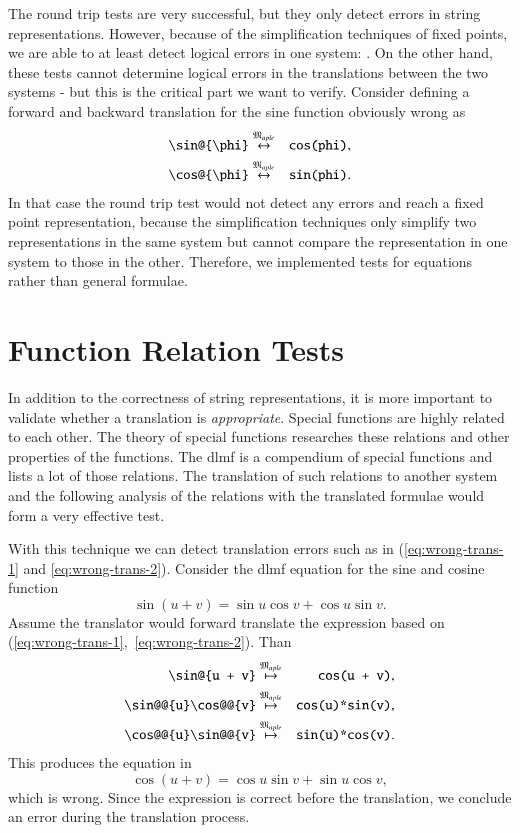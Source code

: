 The round trip tests are very successful, but they only detect errors in string representations. However, because of the simplification techniques of fixed points, we are able to at least detect logical errors in one system: \Maple. On the other hand, these tests cannot determine logical errors in the translations between the two systems - but this is the critical part we want to verify. Consider defining a forward and backward translation for the sine function obviously wrong as
\begin{eqnarray}
\verb|\sin@{\phi}| & \overset{\langMaple}{\leftrightarrow} & \verb|cos(phi)|,\label{eq:wrong-trans-1}\\
\verb|\cos@{\phi}| & \overset{\langMaple}{\leftrightarrow} & \verb|sin(phi)|.\label{eq:wrong-trans-2}
\end{eqnarray}
In that case the round trip test would not detect any errors and reach a fixed point representation, because the simplification techniques only simplify two representations in the same system but cannot compare the representation in one system to those in the other. Therefore, we implemented tests for equations rather than general formulae.

\section{Function Relation Tests}\label{sec:relation-tests}
In addition to the correctness of string representations, it is more important to validate whether a translation is \textit{appropriate}. Special functions are highly related to each other. The theory of special functions researches these relations and other properties of the functions. The \gls{dlmf} is a compendium of special functions and lists a lot of those relations. The translation of such relations to another system and the following analysis of the relations with the translated formulae would form a very effective test.

With this technique we can detect translation errors such as in (\ref{eq:wrong-trans-1} and \ref{eq:wrong-trans-2}). Consider the \gls{dlmf} equation for the sine and cosine function~\parencite[(4.21.2)]{NIST:DLMF}
\begin{equation}
\sin \left(u+v\right) = \sin{u}\cos{v} + \cos{u}\sin{v}.
\end{equation}
Assume the translator would forward translate the expression based on (\ref{eq:wrong-trans-1},~\ref{eq:wrong-trans-2}). Than
\begin{eqnarray}
\verb|\sin@{u + v}| & \overset{\langMaple}{\mapsto} & \verb|cos(u + v)|,\\
\verb|\sin@@{u}\cos@@{v}| & \overset{\langMaple}{\mapsto} & \verb|cos(u)*sin(v)|,\\
\verb|\cos@@{u}\sin@@{v}| & \overset{\langMaple}{\mapsto} & \verb|sin(u)*cos(v)|.
\end{eqnarray}
This produces the equation in \Maple
\begin{equation}
\cos\left(u+v\right) = \cos{u}\sin{v} + \sin{u}\cos{v},
\end{equation}
which is wrong. Since the expression is correct before the translation, we conclude an error during the translation process.

